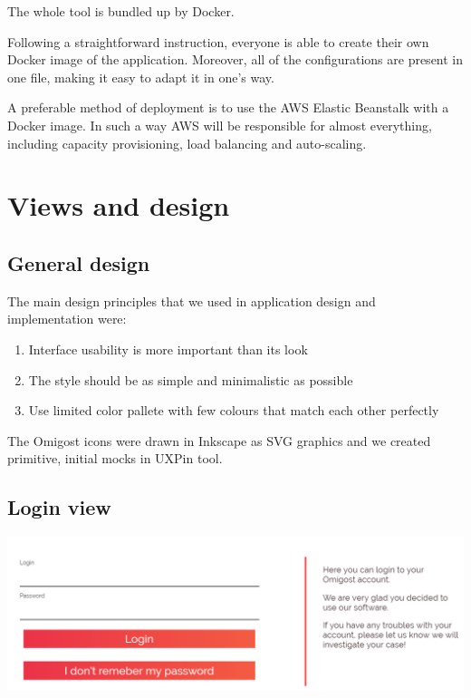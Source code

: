 \documentclass[licencjacka,en]{thesisclass}
\begin{document}
    The whole tool is bundled up by Docker.

    Following a straightforward instruction, everyone is able
    to create their own Docker image of the application.
    Moreover, all of the configurations are present in one file,
    making it easy to adapt it in one's way.

    A preferable method of deployment is to use the AWS Elastic Beanstalk with a Docker image.
    In such a way AWS will be responsible for almost everything,
    including capacity provisioning, load balancing and auto-scaling.

    \section{Views and design}
    
    \subsection{General design}
    
    The main design principles that we used in application design and implementation were:
    \begin{enumerate}
        \item Interface usability is more important than its look
        \item The style should be as simple and minimalistic as possible
        \item Use limited color pallete with few colours that match each other perfectly        
    \end{enumerate}
    
    The Omigost icons were drawn in Inkscape as SVG graphics and we created primitive,
    initial mocks in UXPin \cite{UXPin} tool.
    
    \subsection{Login view}
    
    \includegraphics[width=\textwidth] {imgs/screenshots/screen_login.png}
  
\end{document}
